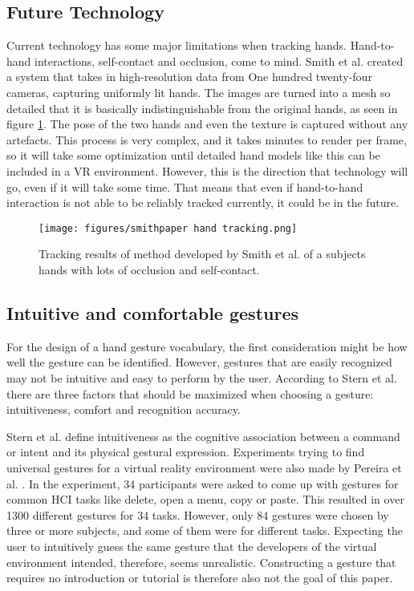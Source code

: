 \subsection{Future Technology}\label{future-technology}

Current technology has some major limitations when tracking hands.
Hand-to-hand interactions, self-contact and occlusion, come to mind.
Smith et al. \cite{Smith} created a system that takes in high-resolution data from
One hundred twenty-four cameras, capturing uniformly lit hands. The images are turned into a
mesh so detailed that it is basically indistinguishable from the original
hands, as seen in figure \ref{fig:smithOcclusion}. The pose of the two hands and even the texture is captured without
any artefacts. This process is very complex, and it takes minutes to
render per frame, so it will take some optimization until detailed hand
models like this can be included in a VR environment. However, this is
the direction that technology will go, even if it will take some time.
That means that even if hand-to-hand interaction is not able to be
reliably tracked currently, it could be in the future.

\begin{figure}[!h]
  \centering
  \texttt{[image: figures/smithpaper hand tracking.png]}
  \caption{Tracking results of method developed by Smith et al. \cite{Smith} of a subjects hands with lots of occlusion and self-contact.}
  \label{fig:smithOcclusion}
\end{figure}


\subsection{Intuitive and comfortable gestures}\label{ergonomics}
For the design of a hand gesture vocabulary, the first consideration might be how well the gesture can be identified. However, gestures that are easily recognized may not be intuitive and easy to perform by the user. According to Stern et al. \cite{Stern2006} there are three factors that should be maximized when choosing a gesture: intuitiveness, comfort and recognition accuracy.

Stern et al. define intuitiveness as the cognitive association between a command or intent and its physical gestural expression. Experiments trying to find universal gestures for a virtual reality environment were also made by Pereira et al. \cite{Pereira2015}. In the experiment, 34 participants were asked to come up with gestures for common HCI tasks like delete, open a menu, copy or paste.
This resulted in over 1300 different gestures for 34 tasks. However, only 84 gestures were chosen by three or more subjects, and some of them were for different tasks. Expecting the user to intuitively guess the same gesture that the developers of the virtual environment intended, therefore, seems unrealistic. Constructing a gesture that requires no introduction or tutorial is therefore also not the goal of this paper.


